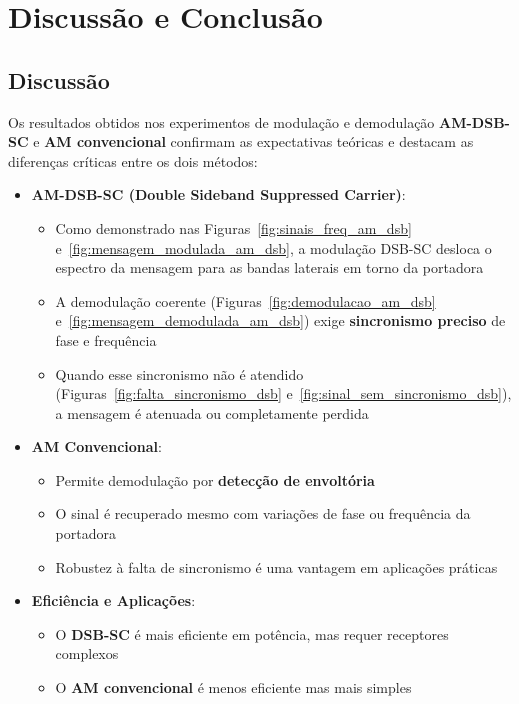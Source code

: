 \section{Discussão e Conclusão}

\subsection{Discussão}

Os resultados obtidos nos experimentos de modulação e demodulação \textbf{AM-DSB-SC} e \textbf{AM convencional} confirmam as expectativas teóricas e destacam as diferenças críticas entre os dois métodos:

\begin{itemize}
    \item \textbf{AM-DSB-SC (Double Sideband Suppressed Carrier)}:
    \begin{itemize}
        \item Como demonstrado nas Figuras~\ref{fig:sinais_freq_am_dsb} e~\ref{fig:mensagem_modulada_am_dsb}, a modulação DSB-SC desloca o espectro da mensagem para as bandas laterais em torno da portadora
        \item A demodulação coerente (Figuras~\ref{fig:demodulacao_am_dsb} e~\ref{fig:mensagem_demodulada_am_dsb}) exige \textbf{sincronismo preciso} de fase e frequência
        \item Quando esse sincronismo não é atendido (Figuras~\ref{fig:falta_sincronismo_dsb} e~\ref{fig:sinal_sem_sincronismo_dsb}), a mensagem é atenuada ou completamente perdida
    \end{itemize}

    \item \textbf{AM Convencional}:
    \begin{itemize}
        \item Permite demodulação por \textbf{detecção de envoltória}
        \item O sinal é recuperado mesmo com variações de fase ou frequência da portadora
        \item Robustez à falta de sincronismo é uma vantagem em aplicações práticas
    \end{itemize}

    \item \textbf{Eficiência e Aplicações}:
    \begin{itemize}
        \item O \textbf{DSB-SC} é mais eficiente em potência, mas requer receptores complexos
        \item O \textbf{AM convencional} é menos eficiente mas mais simples
    \end{itemize}
\end{itemize}

